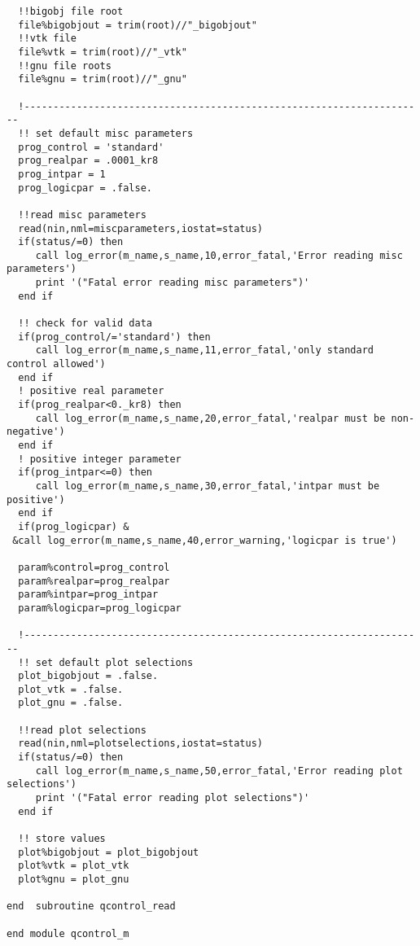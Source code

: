 \begin{verbatim}
  !!bigobj file root
  file%bigobjout = trim(root)//"_bigobjout"
  !!vtk file
  file%vtk = trim(root)//"_vtk"
  !!gnu file roots
  file%gnu = trim(root)//"_gnu"

  !---------------------------------------------------------------------
  !! set default misc parameters
  prog_control = 'standard'
  prog_realpar = .0001_kr8
  prog_intpar = 1
  prog_logicpar = .false.

  !!read misc parameters
  read(nin,nml=miscparameters,iostat=status)
  if(status/=0) then
     call log_error(m_name,s_name,10,error_fatal,'Error reading misc parameters')
     print '("Fatal error reading misc parameters")'
  end if

  !! check for valid data
  if(prog_control/='standard') then
     call log_error(m_name,s_name,11,error_fatal,'only standard control allowed')
  end if
  ! positive real parameter
  if(prog_realpar<0._kr8) then
     call log_error(m_name,s_name,20,error_fatal,'realpar must be non-negative')
  end if
  ! positive integer parameter
  if(prog_intpar<=0) then
     call log_error(m_name,s_name,30,error_fatal,'intpar must be positive')
  end if
  if(prog_logicpar) &
 &call log_error(m_name,s_name,40,error_warning,'logicpar is true')

  param%control=prog_control
  param%realpar=prog_realpar
  param%intpar=prog_intpar
  param%logicpar=prog_logicpar

  !---------------------------------------------------------------------
  !! set default plot selections
  plot_bigobjout = .false.
  plot_vtk = .false.
  plot_gnu = .false.

  !!read plot selections
  read(nin,nml=plotselections,iostat=status)
  if(status/=0) then
     call log_error(m_name,s_name,50,error_fatal,'Error reading plot selections')
     print '("Fatal error reading plot selections")'
  end if

  !! store values
  plot%bigobjout = plot_bigobjout
  plot%vtk = plot_vtk
  plot%gnu = plot_gnu

end  subroutine qcontrol_read

end module qcontrol_m
\end{verbatim}
\normalsize
